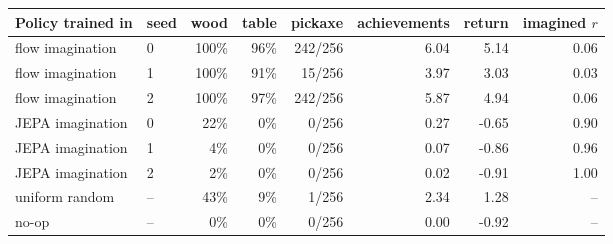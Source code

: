 \begin{tabular}{llrrrrrr}
\toprule
\rowcolor{Navy!8}
Policy trained in & seed & wood & table & pickaxe & achievements & return & imagined $r$ \\
\midrule
\rowcolor{Flow!7}
flow imagination & 0 & 100\% & 96\% & 242/256 & 6.04 & 5.14 & 0.06 \\
\rowcolor{Flow!7}
flow imagination & 1 & 100\% & 91\% & 15/256 & 3.97 & 3.03 & 0.03 \\
\rowcolor{Flow!7}
flow imagination & 2 & 100\% & 97\% & 242/256 & 5.87 & 4.94 & 0.06 \\
\rowcolor{JEPA!7}
JEPA imagination & 0 & 22\% & 0\% & 0/256 & 0.27 & -0.65 & 0.90 \\
\rowcolor{JEPA!7}
JEPA imagination & 1 & 4\% & 0\% & 0/256 & 0.07 & -0.86 & 0.96 \\
\rowcolor{JEPA!7}
JEPA imagination & 2 & 2\% & 0\% & 0/256 & 0.02 & -0.91 & 1.00 \\
\midrule
uniform random & -- & 43\% & 9\% & 1/256 & 2.34 & 1.28 & -- \\
no-op & -- & 0\% & 0\% & 0/256 & 0.00 & -0.92 & -- \\
\bottomrule
\end{tabular}
